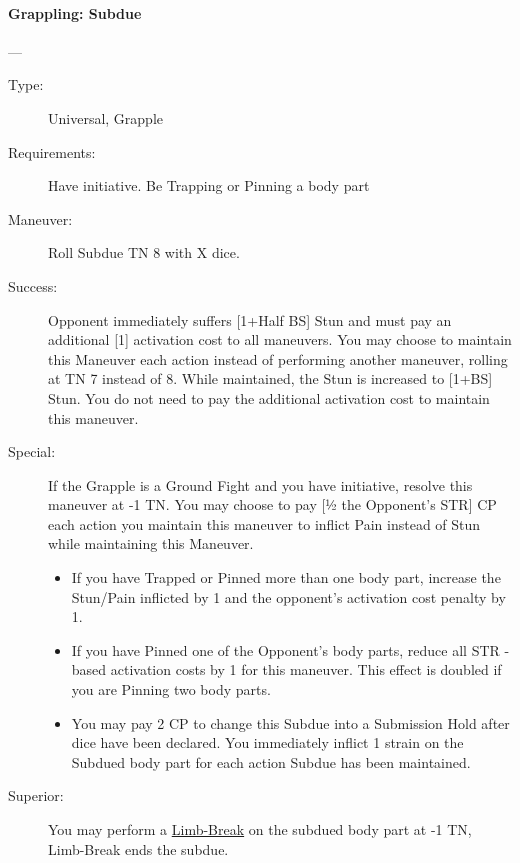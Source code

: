 \paragraph{Grappling: Subdue \large} \label{man:grappling-subdue}
---
\vspace{-10pt} \begin{description}
\item [Type:] Universal, Grapple
\item [Requirements:] Have initiative. Be Trapping or Pinning a body part
\item [Maneuver:] Roll Subdue TN 8 with X dice.
\item [Success:] Opponent immediately suffers [1+Half BS] Stun and must pay an
additional [1] activation cost to all maneuvers. You may choose to maintain this
Maneuver each action instead of performing another maneuver, rolling at TN 7
instead of 8. While maintained, the Stun is increased to [1+BS] Stun. You do not
need to pay the additional activation cost to maintain this maneuver. 

\item [Special:] If the Grapple is a Ground Fight and you have initiative, resolve this
maneuver at -1 TN. You may choose to pay [1⁄2 the Opponent’s STR] CP each action
you maintain this maneuver to inflict Pain instead of Stun while maintaining
this Maneuver. 
  \begin{itemize}
  \item If you have Trapped or Pinned more than one body part, increase the
    Stun/Pain inflicted by 1 and the opponent’s activation cost penalty by 1.  
  \item If you have Pinned one of the Opponent’s body parts, reduce all STR
    -based activation costs by 1 for this maneuver. This effect is doubled if you
  are Pinning two body parts.  
  \item You may pay 2 CP to change this Subdue into a Submission Hold after dice
    have been declared. You immediately inflict 1 strain on the Subdued body part
  for each action Subdue has been maintained.  
  \end{itemize}
\item [Superior:] You may perform a
  \hyperref[man:grappling-limb-break]{Limb-Break} on the subdued body part at -1
  TN, Limb-Break ends the subdue.    
\end{description}


